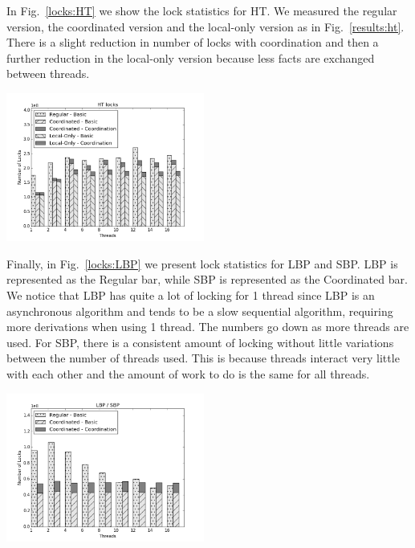 In Fig.~\ref{locks:HT} we show the lock statistics for HT. We measured the
regular version, the coordinated version and the local-only version as in
Fig.~\ref{results:ht}. There is a slight reduction in number of locks with
coordination and then a further reduction in the local-only version because less
facts are exchanged between threads.

\begin{topfig}
   \begin{center}
      \includegraphics[width=6.5cm]{results/locks/ht-locks.png}
   \end{center}
\end{topfig}

Finally, in Fig.~\ref{locks:LBP} we present lock statistics for LBP and SBP. LBP
is represented as the Regular bar, while SBP is represented as the Coordinated
bar. We notice that LBP has quite a lot of locking for 1 thread since LBP
is an asynchronous algorithm and tends to be a slow sequential algorithm,
requiring more derivations when using 1 thread. The numbers go down as more
threads are used. For SBP, there is a consistent amount of locking without
little variations between the number of threads used. This is because threads
interact very little with each other and the amount of work to do is the same
for all threads.

\begin{topfig}
   \begin{center}
      \includegraphics[width=6.5cm]{results/locks/bp.png}
   \end{center}
\end{topfig}

